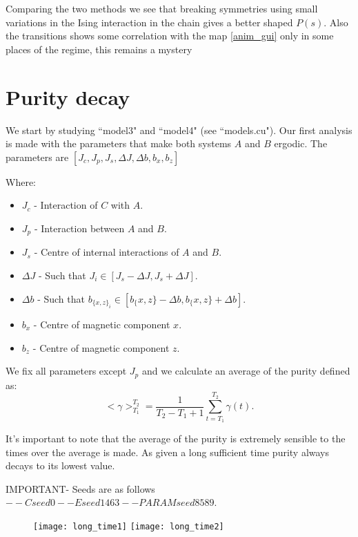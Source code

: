 \documentclass[floatfix]{article}
\begin{document}
Comparing the two methods we see that breaking symmetries using small variations in the Ising interaction in the chain gives
a better shaped $P(s)$. Also the transitions shows some correlation with the map \ref{anim_gui} only in some places of the
regime, this remains a mystery


\section{Purity decay}

We start by studying ``model3" and ``model4" (see ``models.cu"). Our first analysis is made with the parameters that make 
both systems $A$ and $B$ ergodic. The parameters are $[J_c,J_p,J_s,\Delta J,\Delta b, b_x, b_z]$

Where:
\begin{itemize}
\item $J_c$ - Interaction of $C$ with $A$.
\item $J_p$ - Interaction between $A$ and $B$.
\item $J_s$ - Centre of internal interactions of $A$ and $B$.
\item $\Delta J$ - Such that $J_i \in [J_s - \Delta J, J_s + \Delta J]$.
\item $\Delta b$ - Such that $b_{{\{x,z\}}_i} \in [b_\{x,z\} - \Delta b, b_\{x,z\} + \Delta b]$.
\item $b_x$ - Centre of magnetic component $x$.
\item $b_z$ - Centre of magnetic component $z$. 
\end{itemize}

We fix all parameters except $J_p$ and we calculate an average of the purity defined as:
\begin{equation}
<\gamma>_{T_1}^{T_2} = \frac{1}{T_2-T_1+1} \sum_{t=T_1}^{T_2} \gamma(t).
\end{equation}

It's important to note that the average of the purity is extremely sensible to the times over the average is made. 
As given a long sufficient time purity always decays to its lowest value.

IMPORTANT- Seeds are as follows $--Cseed 0 --Eseed 1463 --PARAMseed 8589$.

\begin{figure}[H]
\begin{center}
\texttt{[image: long\_time1]}  
\texttt{[image: long\_time2]}  
\end{center}
\caption{}
\label{p_m3}
\end{figure}
\end{document}

